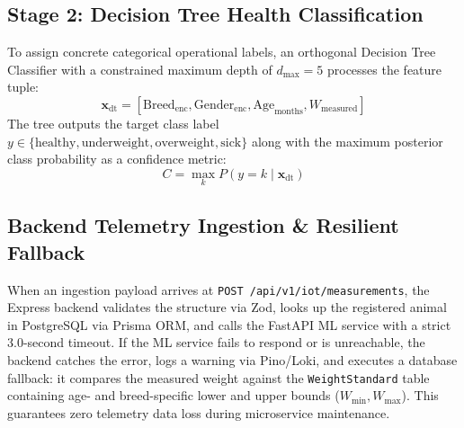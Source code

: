 \documentclass[11pt,a4paper]{report}
\begin{document}
\subsection{Stage 2: Decision Tree Health Classification}
To assign concrete categorical operational labels, an orthogonal Decision Tree Classifier with a constrained maximum depth of $d_{\max} = 5$ processes the feature tuple:
\begin{equation}
    \mathbf{x}_{\text{dt}} = [\text{Breed}_{\text{enc}}, \text{Gender}_{\text{enc}}, \text{Age}_{\text{months}}, W_{\text{measured}}]
\end{equation}
The tree outputs the target class label $y \in \{\text{healthy}, \text{underweight}, \text{overweight}, \text{sick}\}$ along with the maximum posterior class probability as a confidence metric:
\begin{equation}
    C = \max_{k} P(y = k \mid \mathbf{x}_{\text{dt}})
\end{equation}

\subsection{Backend Telemetry Ingestion \& Resilient Fallback}
When an ingestion payload arrives at \texttt{POST /api/v1/iot/measurements}, the Express backend validates the structure via Zod, looks up the registered animal in PostgreSQL via Prisma ORM, and calls the FastAPI ML service with a strict 3.0-second timeout. If the ML service fails to respond or is unreachable, the backend catches the error, logs a warning via Pino/Loki, and executes a database fallback: it compares the measured weight against the \texttt{WeightStandard} table containing age- and breed-specific lower and upper bounds ($W_{\min}, W_{\max}$). This guarantees zero telemetry data loss during microservice maintenance.
\end{document}
